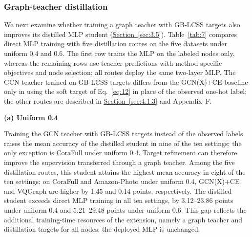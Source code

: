 \documentclass[10pt,letterpaper,nopreprintline]{elsarticle}
\theoremstyle{definition}
\theoremstyle{plain}
\begin{document}
\subsubsection{Graph-teacher distillation}\label{sec:4.4.1}

We next examine whether training a graph teacher with GB-LCSS targets also improves its distilled MLP student (\hyperref[sec:3.5]{Section~\ref*{sec:3.5}}). Table~\ref{tab:7} compares direct MLP training with five distillation routes on the five datasets under uniform 0.4 and 0.6. The first row trains the MLP on the labeled nodes only, whereas the remaining rows use teacher predictions with method-specific objectives and node selection; all routes deploy the same two-layer MLP. The GCN teacher trained on GB-LCSS targets differs from the GCN(X)+CE baseline only in using the soft target of Eq.~\eqref{eq:12} in place of the observed one-hot label; the other routes are described in \hyperref[sec:4.1.3]{Section~\ref*{sec:4.1.3}} and Appendix~F.

\begin{table}[!htb]
\centering
\caption{Test accuracy of deployed MLPs under direct training and graph-to-MLP distillation.}\label{tab:7}
{\small\textbf{(a) Uniform 0.4}}\par\smallskip



\par{}\par\smallskip



\end{table}

Training the GCN teacher with GB-LCSS targets instead of the observed labels raises the mean accuracy of the distilled student in nine of the ten settings; the only exception is CoraFull under uniform 0.4. Target refinement can therefore improve the supervision transferred through a graph teacher. Among the five distillation routes, this student attains the highest mean accuracy in eight of the ten settings; on CoraFull and Amazon-Photo under uniform 0.4, GCN(X)+CE and VQGraph are higher by 1.45 and 0.14 points, respectively. The distilled student exceeds direct MLP training in all ten settings, by 3.12--23.86 points under uniform 0.4 and 5.21--29.48 points under uniform 0.6. This gap reflects the additional training-time resources of the extension, namely a graph teacher and distillation targets for all nodes; the deployed MLP is unchanged.
\end{document}
